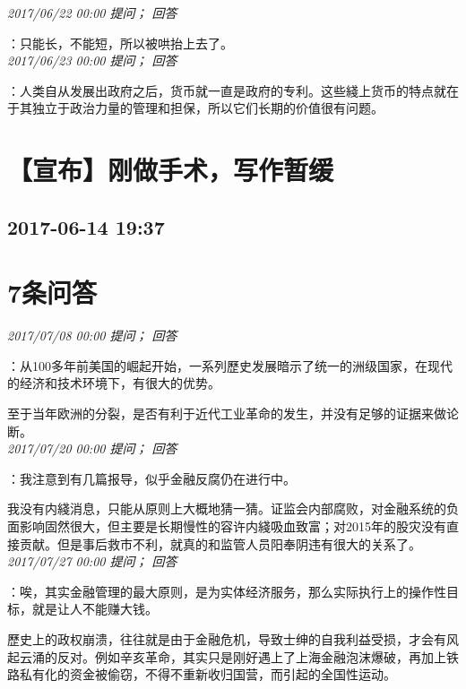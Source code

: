 \documentclass[twocolumn]{ctexart}
\begin{document}
\textit{\hfill\noindent\small 2017/06/22 00:00 提问； 回答}

：只能长，不能短，所以被哄抬上去了。\\

\textit{\hfill\noindent\small 2017/06/23 00:00 提问； 回答}

：人类自从发展出政府之后，货币就一直是政府的专利。这些綫上货币的特点就在于其独立于政治力量的管理和担保，所以它们长期的价值很有问题。\\


\section{【宣布】刚做手术，写作暂缓}
\subsection{2017-06-14 19:37}


\section{7条问答}

\textit{\hfill\noindent\small 2017/07/08 00:00 提问； 回答}

：从100多年前美国的崛起开始，一系列歷史发展暗示了统一的洲级国家，在现代的经济和技术环境下，有很大的优势。

至于当年欧洲的分裂，是否有利于近代工业革命的发生，并没有足够的证据来做论断。\\

\textit{\hfill\noindent\small 2017/07/20 00:00 提问； 回答}

：我注意到有几篇报导，似乎金融反腐仍在进行中。

我没有内綫消息，只能从原则上大概地猜一猜。证监会内部腐败，对金融系统的负面影响固然很大，但主要是长期慢性的容许内綫吸血致富；对2015年的股灾没有直接贡献。但是事后救市不利，就真的和监管人员阳奉阴违有很大的关系了。\\

\textit{\hfill\noindent\small 2017/07/27 00:00 提问； 回答}

：唉，其实金融管理的最大原则，是为实体经济服务，那么实际执行上的操作性目标，就是让人不能赚大钱。

歷史上的政权崩溃，往往就是由于金融危机，导致士绅的自我利益受损，才会有风起云涌的反对。例如辛亥革命，其实只是刚好遇上了上海金融泡沫爆破，再加上铁路私有化的资金被偷窃，不得不重新收归国营，而引起的全国性运动。\\
\end{document}
